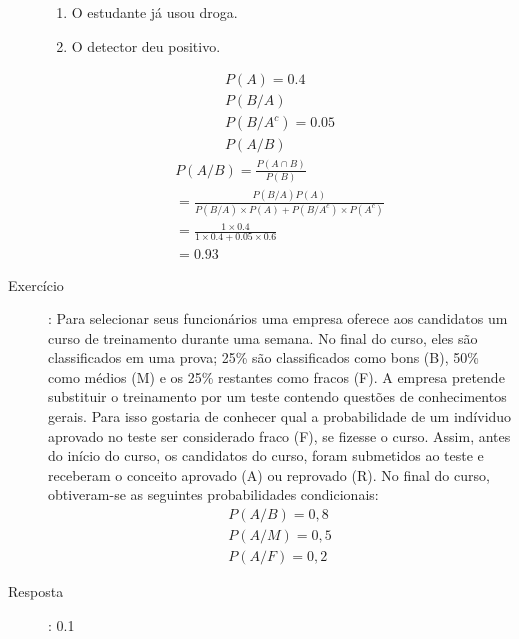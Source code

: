 \begin{description}
       \begin{enumerate}[label=\Alph*:]
         \item  O estudante já usou droga.
         \item  O detector deu positivo.
       \end{enumerate}
       \begin{align*}
         P(A)= 0.4 \\
         P( B / A ) \\
         P(B / A^c) = 0.05\\
         P(A / B)
       \end{align*}
       \begin{align*}
         P(A/B)= \frac{P(A \cap B)}{P(B)} \\
         = \frac{P(B/A)P(A)}{P(B/A)\times P(A) + P(B/A^c) \times P(A^c)}\\
         = \frac{1 \times 0.4}{1 \times 0.4 + 0.05 \times 0.6}\\
         =0.93
       \end{align*}
     \item  [Exercício]: Para selecionar seus funcionários uma empresa oferece aos candidatos 
       um curso de treinamento durante uma semana. No final do curso, eles são classificados
       em uma prova; 25\% são classificados como bons (B), 50\% como médios (M) e os 
       25\% restantes como fracos (F). A empresa pretende substituir o treinamento por um teste 
       contendo questões de conhecimentos gerais. Para isso gostaria de conhecer qual a 
       probabilidade de um indíviduo aprovado no teste ser considerado fraco (F), se 
       fizesse o curso. Assim, antes do início do curso, os candidatos do curso, foram 
       submetidos ao teste e receberam o conceito aprovado (A) ou reprovado (R). No final 
       do curso, obtiveram-se as seguintes probabilidades condicionais: 
       \begin{align*}
         P(A/B)= 0,8\\
         P(A/M) = 0,5\\
         P(A/F)=0,2
       \end{align*}
     \item [Resposta]: 0.1
   \end{description}
